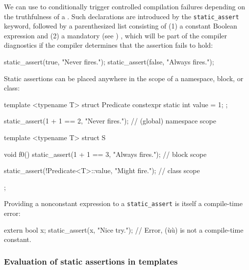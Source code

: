We can use  to conditionally trigger
controlled compilation failures depending on the truthfulness of a
. Such declarations are introduced by the
\lstinline!static_assert! keyword, followed by a parenthesized list
consisting of (1) a constant Boolean expression and (2) a mandatory (see
)
, which will be
part of the compiler diagnostics if the compiler determines that the
assertion fails to hold:

\begin{emcppslisting}[emcppserrorlines=2]
static_assert(true, "Never fires.");
static_assert(false, "Always fires.");  
\end{emcppslisting}

\noindent Static assertions can be placed anywhere in the scope of a namespace,
block, or class:

\begin{emcppshiddenlisting}[emcppsbatch=e1]
template <typename T> struct Predicate
{
   constexpr static int value = 1;
};
\end{emcppshiddenlisting}
\begin{emcppslisting}[emcppsbatch=e1,emcppserrorlines=8]
static_assert(1 + 1 == 2, "Never fires.");  // (global) namespace scope

template <typename T>
struct S
{
    void f0()
    {
        static_assert(1 + 1 == 3, "Always fires.");  // block scope
    }

    static_assert(!Predicate<T>::value, "Might fire.");  // class scope
};
\end{emcppslisting}

\noindent Providing a nonconstant expression to a \lstinline!static_assert! is
itself a compile-time error:

\begin{emcppslisting}
extern bool x;
static_assert(x, "Nice try.");  // Error, (ù{}ù) is not a compile-time constant.
\end{emcppslisting}


\subsubsection[Evaluation of static assertions in templates]{Evaluation of static assertions in templates}\label{evaluation-of-static-assertions-in-templates}

